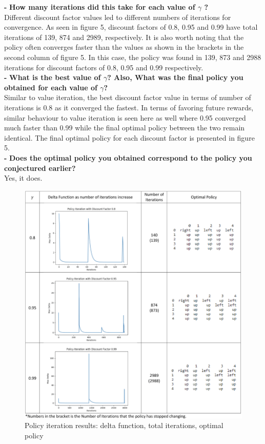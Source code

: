 \documentclass[11pt]{article}
\begin{document}
\noindent
\textbf{-}
\noindent
\textbf{How many iterations did this take for each value of $\gamma$ ?}
\\

\noindent
Different discount factor values led to different numbers of iterations for
convergence. As seen in figure 5, discount factors of 0.8, 0.95 and 0.99 have
total iterations of 139, 874 and 2989, respectively. It is also worth noting
that the policy often converges faster than the values as shown in the brackets
in the second column of figure 5. In this case, the policy was found in 139,
873 and 2988 iterations for discount factors of 0.8, 0.95 and 0.99
respectively. \\

\noindent
\textbf{-}
\noindent
\textbf{What is the best value of $\gamma$? Also, What was the final policy you
obtained for each value of $\gamma$?}
\\

\noindent
Similar to value iteration, the best discount factor value in terms of number of
iterations is 0.8 as it converged the fastest. In terms of favoring future
rewards, similar behaviour to value iteration is seen here as well where 0.95
converged much faster than 0.99 while the final optimal policy between the two
remain identical. The final optimal policy for each discount factor is presented
in figure 5. \\

\noindent
\textbf{-}
\noindent
\textbf{Does the optimal policy you obtained correspond to the policy you
conjectured earlier?}
\\

\noindent
Yes, it does.
\\

\newpage
\begin{figure}[h]
\includegraphics[scale=0.5]{PI_chart}
\centering
\caption{Policy iteration results: delta function, total iterations, optimal policy}
\end{figure}
\end{document}

